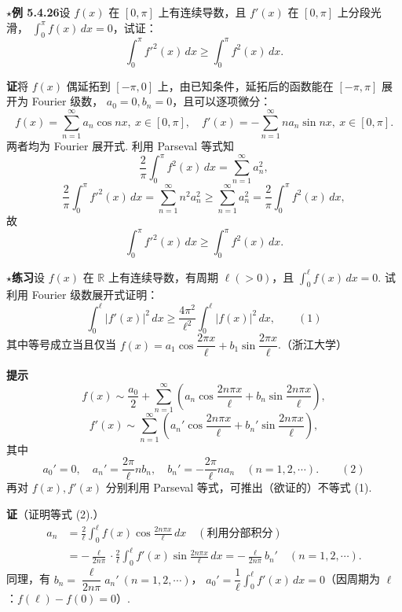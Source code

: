 \documentclass[UTF8,12pt,a4paper,fontset=fandol]{ctexart}
\begin{document}
\noindent\(\star\)\textbf{例 5.4.26}\quad 设 $f(x)$ 在 $[0,\pi]$ 上有连续导数，且 $f'(x)$ 在 $[0,\pi]$ 上分段光滑，
$\displaystyle\int_0^{\pi}f(x)\,dx=0$，试证：
\[
  \int_0^{\pi}f'^2(x)\,dx\ge\int_0^{\pi}f^2(x)\,dx.
\]

\noindent\textbf{证}\quad 将 $f(x)$ 偶延拓到 $[-\pi,0]$ 上，由已知条件，延拓后的函数能在 $[-\pi,\pi]$ 展开为 Fourier 级数，
$a_0=0,b_n=0$，且可以逐项微分：
\[
  f(x)=\sum_{n=1}^{\infty}a_n\cos nx,\ x\in[0,\pi],\quad
  f'(x)=-\sum_{n=1}^{\infty}na_n\sin nx,\ x\in[0,\pi].
\]
两者均为 Fourier 展开式. 利用 Parseval 等式知
\[
  \frac2\pi\int_0^{\pi}f^2(x)\,dx=\sum_{n=1}^{\infty}a_n^2,
\]
\[
  \frac2\pi\int_0^{\pi}f'^2(x)\,dx
  =\sum_{n=1}^{\infty}n^2a_n^2\ge\sum_{n=1}^{\infty}a_n^2
  =\frac2\pi\int_0^{\pi}f^2(x)\,dx,
\]
故
\[
  \int_0^{\pi}f'^2(x)\,dx\ge\int_0^{\pi}f^2(x)\,dx.
\]

\noindent\(\star\)\textbf{练习}\quad 设 $f(x)$ 在 $\mathbb R$ 上有连续导数，有周期 $\ell(>0)$，且
$\displaystyle\int_0^{\ell}f(x)\,dx=0$. 试利用 Fourier 级数展开式证明：
\[
  \int_0^{\ell}|f'(x)|^2\,dx\ge\frac{4\pi^2}{\ell^2}\int_0^{\ell}|f(x)|^2\,dx, \qquad(1)
\]
其中等号成立当且仅当 $f(x)=a_1\cos\dfrac{2\pi x}{\ell}+b_1\sin\dfrac{2\pi x}{\ell}$.（浙江大学）

\noindent\textbf{提示}\quad
\[
  f(x)\sim\frac{a_0}{2}+\sum_{n=1}^{\infty}
  \left(a_n\cos\frac{2n\pi x}{\ell}+b_n\sin\frac{2n\pi x}{\ell}\right),
\]
\[
  f'(x)\sim\sum_{n=1}^{\infty}
  \left(a_n'\cos\frac{2n\pi x}{\ell}+b_n'\sin\frac{2n\pi x}{\ell}\right),
\]
其中
\[
  a_0'=0,\quad a_n'=\frac{2\pi}{\ell}nb_n,\quad b_n'=-\frac{2\pi}{\ell}na_n
  \quad(n=1,2,\cdots). \qquad(2)
\]
再对 $f(x),f'(x)$ 分别利用 Parseval 等式，可推出（欲证的）不等式 (1).

\noindent\textbf{证}\quad （证明等式 (2).）
\[
\begin{aligned}
a_n&=\frac2{\ell}\int_0^{\ell}f(x)\cos\frac{2n\pi x}{\ell}\,dx\quad(\text{利用分部积分})\\
&=-\frac{\ell}{2n\pi}\cdot\frac2{\ell}\int_0^{\ell}f'(x)\sin\frac{2n\pi x}{\ell}\,dx
=-\frac{\ell}{2n\pi}b_n'\quad(n=1,2,\cdots).
\end{aligned}
\]
同理，有 $b_n=\dfrac{\ell}{2n\pi}a_n'\ (n=1,2,\cdots)$，
$a_0'=\dfrac1{\ell}\int_0^{\ell}f'(x)\,dx=0$（因周期为 $\ell$：$f(\ell)-f(0)=0$）.
\end{document}
